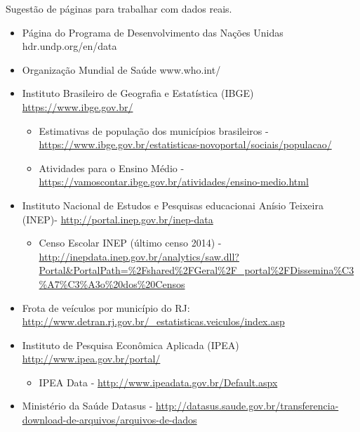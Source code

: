 Sugestão de páginas para trabalhar com dados reais.
\begin{itemize}
\item {} 
Página do Programa de Desenvolvimento das Nações Unidas \textendash{} hdr.undp.org/en/data

\item {} 
Organização Mundial de Saúde \textendash{} www.who.int/

\item {} 
Instituto Brasileiro de Geografia e Estatística (IBGE) \textendash{} \url{https://www.ibge.gov.br/}
\begin{itemize}
\item {} 
Estimativas de população dos municípios brasileiros - \url{https://www.ibge.gov.br/estatisticas-novoportal/sociais/populacao/}

\item {} 
Atividades para o Ensino Médio - \url{https://vamoscontar.ibge.gov.br/atividades/ensino-medio.html}

\end{itemize}

\item {} 
Instituto Nacional de Estudos e Pesquisas educacionai Anísio Teixeira (INEP)-  \url{http://portal.inep.gov.br/inep-data}
\begin{itemize}
\item {} 
Censo Escolar INEP (último censo 2014) - \url{http://inepdata.inep.gov.br/analytics/saw.dll?Portal\&PortalPath=\%2Fshared\%2FGeral\%2F\_portal\%2FDissemina\%C3\%A7\%C3\%A3o\%20dos\%20Censos}

\end{itemize}

\item {} 
Frota de veículos por município do RJ: \url{http://www.detran.rj.gov.br/\_estatisticas.veiculos/index.asp}

\item {} 
Instituto de Pesquisa Econômica Aplicada (IPEA) \textendash{} \url{http://www.ipea.gov.br/portal/}
\begin{itemize}
\item {} 
IPEA Data - \url{http://www.ipeadata.gov.br/Default.aspx}

\end{itemize}

\item {} 
Ministério da Saúde \textendash{} Datasus - \url{http://datasus.saude.gov.br/transferencia-download-de-arquivos/arquivos-de-dados}

\end{itemize}


